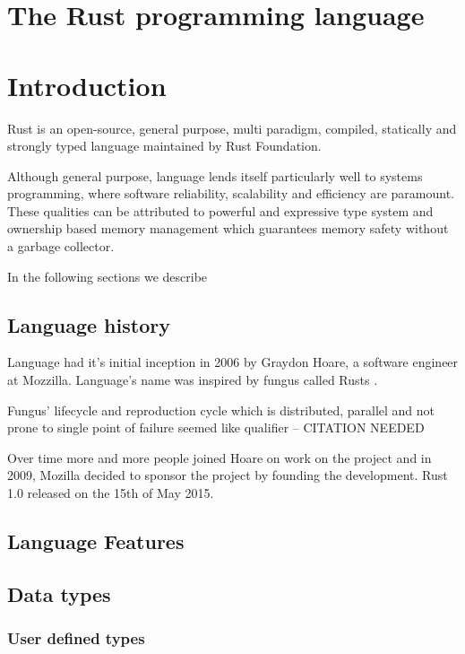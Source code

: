 
\chapter{The Rust programming language}

\chapter*{Introduction}

Rust is an open-source, general purpose, multi paradigm, compiled, statically and strongly typed language maintained by Rust Foundation.

Although general purpose, language lends itself particularly well to systems programming, where software reliability, scalability and efficiency are paramount.
These qualities can be attributed to powerful and expressive type system and ownership based memory management which guarantees memory safety without a garbage collector.

In the following sections we describe

\section{Language history}

Language had it's initial inception in 2006 by Graydon Hoare, a software engineer at Mozzilla. Language's name was inspired by fungus called Rusts \cite{thompson2023rust}. 

Fungus' lifecycle and reproduction cycle which is distributed, parallel and not prone to single point of failure seemed like qualifier -- CITATION NEEDED

Over time more and more people joined Hoare on work on the project and in 2009, Mozilla decided to sponsor the project by founding the development. Rust 1.0 released on the 15th of May 2015.

\section{Language Features}

\section{Data types}


\subsection{User defined types}

